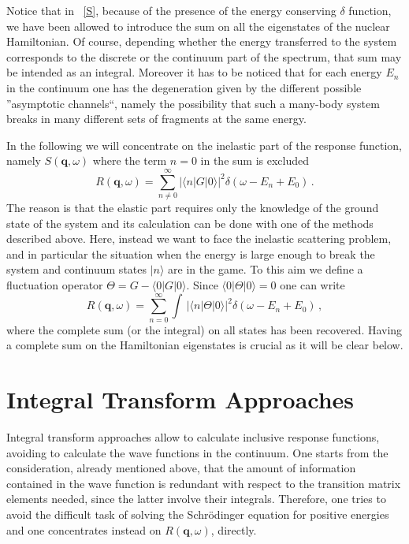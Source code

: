 Notice that in ~\ref{S}, because of the presence of the energy conserving $\delta$ function, we have been allowed to introduce 
the sum on all the eigenstates of the nuclear Hamiltonian. 
Of course, depending whether the energy transferred to the system corresponds to the discrete or the continuum 
part of the spectrum, that sum may be intended as an integral. Moreover it has to be noticed that for each energy $E_n$ in the continuum 
one has the degeneration given by the different possible ''asymptotic channels``, namely the possibility that such a many-body system 
breaks in many different sets of fragments at the same energy. 

In the following we will concentrate on the inelastic part of the response function, namely $S(\mathbf{q},\omega)$ where the term
$n=0$ in the sum is excluded
 \begin{equation}
R(\mathbf{q},\omega)= \sum_{n \neq 0}^\infty |\langle n|G|0\rangle|^2 \delta(\omega-E_n+E_0)\,.
\end{equation}
The reason is that the elastic part requires only the knowledge of the ground state of the system and its calculation 
can be done with one of the methods described above.
Here, instead we want to face the inelastic scattering problem, and in particular the situation when the energy is large 
enough to break the system and continuum states $|n\rangle$ are in the game.  
To this aim we  define a fluctuation operator $\Theta= G - \langle0|G|0\rangle$. Since $\langle0|\Theta|0\rangle=0$ one can write
 \begin{equation}
R(\mathbf{q},\omega)= \sum_{n = 0}^\infty\!\!\!\!\!\!\!\!\!\!\!\int\, |\langle n|\Theta|0\rangle|^2 \delta(\omega-E_n+E_0)\,,
\end{equation}
where the complete sum (or the integral) on all states has been recovered. Having a complete sum on the Hamiltonian eigenstates 
is crucial as it will be clear below. 

\section{Integral Transform Approaches}\label{sec:ITA}

Integral transform  approaches allow to calculate inclusive response functions, 
avoiding to calculate the wave functions in the  continuum.
One starts from the consideration, already mentioned above, that 
the amount of information contained in the  wave function is  
redundant with respect to the transition matrix elements needed, since the latter involve their integrals.
Therefore, one tries to avoid 
the difficult task of solving the Schr\"odinger
equation for positive energies and one concentrates instead on $R(\mathbf{q},\omega)$, directly. 


